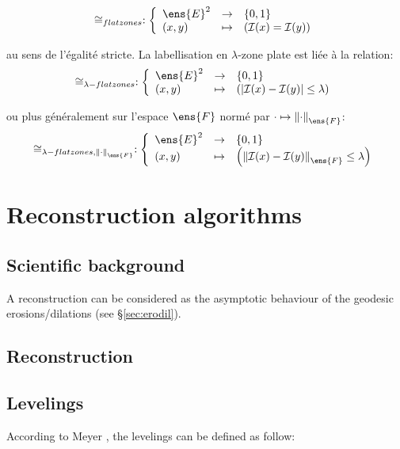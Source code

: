 \[
	\cong_{flat zones} : 
		\left\{
		\begin{array}{lcl}
			\ens{E}^2&\rightarrow&\{0,1\}\\
			(x,y) &\mapsto& \left(\mathcal{I}(x) = \mathcal{I}(y)\right)
		\end{array}
		\right.
\]

au sens de l'égalité stricte. La labellisation en $\lambda$-zone plate est liée à la relation:
\[
	\cong_{\lambda-flat zones} : 
		\left\{
		\begin{array}{lcl}
			\ens{E}^2&\rightarrow&\{0,1\}\\
			(x,y) &\mapsto& \left(\left|\mathcal{I}(x) - \mathcal{I}(y)\right| \leq \lambda\right)
		\end{array}
		\right.
\]

ou plus généralement sur l'espace $\ens{F}$ normé par $\cdot \mapsto \left\| \cdot \right\|_\ens{F}$:
\[
	\cong_{\lambda-flat zones, \left\| \cdot \right\|_\ens{F}} : 
		\left\{
		\begin{array}{lcl}
			\ens{E}^2&\rightarrow&\{0,1\}\\
			(x,y) &\mapsto& \left(\left\|\mathcal{I}(x) - \mathcal{I}(y)\right\|_\ens{F} \leq \lambda\right)
		\end{array}
		\right.
\]













\chapter{Reconstruction algorithms}

\section{Scientific background}
A reconstruction can be considered as the asymptotic behaviour of the geodesic erosions/dilations (see \S \ref{sec:erodil}). 
\section{Reconstruction}

\section{Levelings}
According to Meyer \cite{levelings_meyer:1999}, the levelings can be defined as follow:

